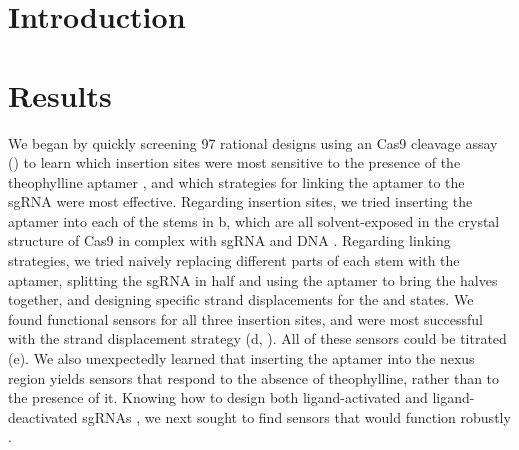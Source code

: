 \documentclass[10pt,oneside]{article}
\begin{document}
\section{Introduction}








\section{Results}





We began by quickly screening 97 rational designs using an \invitro{} Cas9 cleavage assay () to learn which insertion sites were most sensitive to the presence of the theophylline aptamer \autocite{jenison1994}, and which strategies for linking the aptamer to the sgRNA were most effective.  Regarding insertion sites, we tried inserting the aptamer into each of the stems in b, which are all solvent-exposed in the crystal structure of Cas9 in complex with sgRNA and DNA \autocite{nishimasu2014}.  Regarding linking strategies, we tried naively replacing different parts of each stem with the aptamer, splitting the sgRNA in half and using the aptamer to bring the halves together, and designing specific strand displacements for the \apo{} and \holo{} states.  We found functional sensors for all three insertion sites, and were most successful with the strand displacement strategy (d, ).  All of these sensors could be titrated (e).  We also unexpectedly learned that inserting the aptamer into the nexus region yields sensors that respond to the absence of theophylline, rather than to the presence of it.  Knowing how to design both ligand-activated and ligand-deactivated sgRNAs \invitro{}, we next sought to find sensors that would function robustly \invivo{}.
\end{document}
